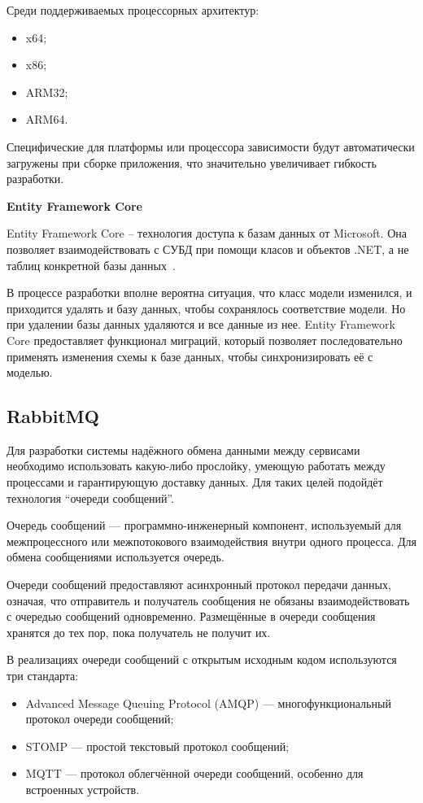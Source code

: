 Среди поддерживаемых процессорных архитектур:
\begin{itemize}
    \item x64;
    \item x86;
    \item ARM32;
    \item ARM64.
\end{itemize}

Специфические для платформы или процессора зависимости будут автоматически загружены при сборке приложения, что значительно увеличивает гибкость разработки.

\bigskip
\textbf{Entity Framework Core}

Entity Framework Core – технология доступа к базам данных от Microsoft. Она позволяет взаимодействовать с СУБД при помощи класов и объектов .NET, а не таблиц конкретной базы данных~\cite{enity_framework}.

В процессе разработки вполне вероятна ситуация, что класс модели изменился, и приходится удалять и базу данных, чтобы сохранялось соответствие модели. Но при удалении базы данных удаляются и все данные из нее. Entity Framework Core предоставляет функционал миграций, который позволяет последовательно применять изменения схемы к базе данных, чтобы синхронизировать её с моделью.


\subsection{RabbitMQ}

Для разработки системы надёжного обмена данными между сервисами необходимо использовать какую-либо прослойку, умеющую работать между процессами и гарантирующую доставку данных. Для таких целей подойдёт технология ``очереди сообщений''.

Очередь сообщений — программно-инженерный компонент, используемый для межпроцессного или межпотокового взаимодействия внутри одного процесса. Для обмена сообщениями используется очередь.

Очереди сообщений предоставляют асинхронный протокол передачи данных, означая, что отправитель и получатель сообщения не обязаны взаимодействовать с очередью сообщений одновременно. Размещённые в очереди сообщения хранятся до тех пор, пока получатель не получит их.

В реализациях очереди сообщений с открытым исходным кодом используются три стандарта:

\begin{itemize}
    \item Advanced Message Queuing Protocol (AMQP) — многофункциональный протокол очереди сообщений;
    \item STOMP  — простой текстовый протокол сообщений;
    \item MQTT — протокол облегчённой очереди сообщений, особенно для встроенных устройств.
\end{itemize}

